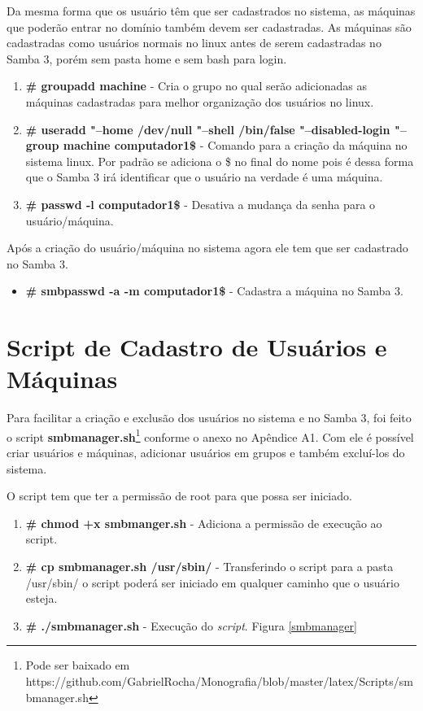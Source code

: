 Da mesma forma que os usuário têm que ser cadastrados no sistema, as máquinas que poderão entrar no domínio também devem ser cadastradas. As máquinas são cadastradas como usuários normais no linux antes de serem cadastradas no Samba 3, porém sem pasta home e sem bash para login.

\begin{enumerate}
	\item \textbf{\# groupadd machine} - Cria o grupo no qual serão adicionadas as máquinas cadastradas para melhor organização dos usuários no linux.
	\item \textbf{\# useradd "--home /dev/null "--shell /bin/false "--disabled-login "--group machine computador1\$} - 	Comando para a criação da máquina no sistema linux. Por padrão se adiciona o \$ no final do nome pois é dessa forma que o Samba 3 irá identificar que o usuário na verdade é uma máquina. 
	\item \textbf{\# passwd -l computador1\$} - Desativa a mudança da senha para o usuário/máquina.
\end{enumerate}

Após a criação do usuário/máquina no sistema agora ele tem que ser cadastrado no Samba 3.

\begin{itemize}	
	\item \textbf{\# smbpasswd -a -m computador1\$} - Cadastra a máquina no Samba 3.
\end{itemize}


\section{Script de Cadastro de Usuários e Máquinas}

Para facilitar a criação e exclusão dos usuários no sistema e no Samba 3, foi feito o script \textbf{smbmanager.sh}\footnote[1]{Pode ser baixado em https://github.com/GabrielRocha/Monografia/blob/master/latex/Scripts/smbmanager.sh} conforme o anexo no Apêndice A1. Com ele é possível criar usuários e máquinas, adicionar usuários em grupos e também excluí-los do sistema.

O script tem que ter a permissão de root para que possa ser iniciado.

\begin{enumerate}
	\item \textbf{\# chmod +x smbmanger.sh} - Adiciona a permissão de execução ao script.
	\item \textbf{\# cp smbmanager.sh /usr/sbin/} - Transferindo o script para a pasta /usr/sbin/ o script poderá ser iniciado em qualquer caminho que o usuário esteja.
	\item \textbf{\# ./smbmanager.sh} - Execução do \textit{script}. Figura \ref{smbmanager}
\end{enumerate}

